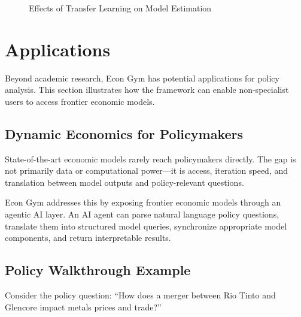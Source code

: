 \documentclass[12pt]{article}
\begin{document}
\begin{figure}[H]
\centering
{}
\caption{Effects of Transfer Learning on Model Estimation}
\label{fig:transfer}
\end{figure}

\section{Applications} \label{sec:applications}

Beyond academic research, Econ Gym has potential applications for policy analysis. This section illustrates how the framework can enable non-specialist users to access frontier economic models.

\subsection{Dynamic Economics for Policymakers}

State-of-the-art economic models rarely reach policymakers directly. The gap is not primarily data or computational power---it is access, iteration speed, and translation between model outputs and policy-relevant questions.

Econ Gym addresses this by exposing frontier economic models through an agentic AI layer. An AI agent can parse natural language policy questions, translate them into structured model queries, synchronize appropriate model components, and return interpretable results.

\subsection{Policy Walkthrough Example}

Consider the policy question: ``How does a merger between Rio Tinto and Glencore impact metals prices and trade?''
\end{document}
